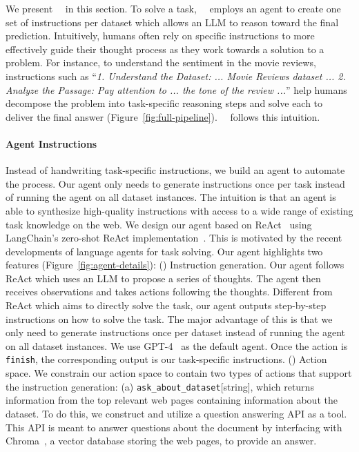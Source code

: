 We present \zeroshotmid\ \method\ in this section. To solve a task, \zeroshotmid\ \method\ employs an agent to create one set of instructions per dataset which allows an LLM to reason toward the final prediction. Intuitively, humans often rely on specific instructions to more effectively guide their thought process as they work towards a solution to a problem. For instance, to understand the sentiment in the movie reviews, instructions such as ``\textit{1. Understand the Dataset: ... Movie Reviews dataset ... 2. Analyze the Passage: Pay attention to ... the tone of the review ...}'' help humans decompose the problem into task-specific reasoning steps and solve each to deliver the final answer (Figure~\ref{fig:full-pipeline}). \zeroshotstart\ \method\ follows this intuition.


\paragraph{Agent Instructions} Instead of handwriting task-specific instructions, we build an agent to automate the process. Our agent only needs to generate instructions once per task instead of running the agent on all dataset instances. The intuition is that an agent is able to synthesize high-quality instructions with access to a wide range of existing task knowledge on the web. We design our agent based on ReAct~\citep{yao2023react} using LangChain's zero-shot ReAct implementation~\citep{langchain}. This is motivated by the recent developments of language agents for task solving. Our agent highlights two features (Figure~\ref{fig:agent-details}): (\expandafter{}) Instruction generation. Our agent follows ReAct which uses an LLM to propose a series of thoughts. The agent then receives observations and takes actions following the thoughts. Different from ReAct which aims to directly solve the task, our agent outputs step-by-step instructions on how to solve the task. The major advantage of this is that we only need to generate instructions once per dataset instead of running the agent on all dataset instances. We use GPT-4~\citep{openai2023gpt4} as the default agent. Once the action is \texttt{finish}, the corresponding output is our task-specific instructions. (\expandafter{}) Action space.
We constrain our action space to contain two types of actions that support the instruction generation: 
(a) \texttt{ask\_about\_dataset}[string], which returns information from the top relevant web pages containing information about the dataset. To do this, we construct and utilize a question answering API as a tool. This API is meant to answer questions about the document by interfacing with Chroma~\citep{chroma}, a vector database storing the web pages, to provide an answer.
